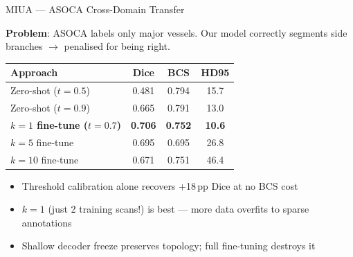 \documentclass[aspectratio=169,10pt]{beamer}
\newcommand{\good}[1]{\textcolor{green!60!black}{\textbf{#1}}}
\newcommand{\pp}{\,pp}
\begin{document}
\begin{frame}{MIUA --- ASOCA Cross-Domain Transfer}

\textbf{Problem}: ASOCA labels only major vessels. Our model correctly segments side branches $\rightarrow$ penalised for being right.

\vspace{0.2cm}
\centering
\begin{tabular}{l c c c}
\toprule
\textbf{Approach} & \textbf{Dice} & \textbf{BCS} & \textbf{HD95} \\
\midrule
Zero-shot ($t=0.5$) & 0.481 & 0.794 & 15.7 \\
Zero-shot ($t=0.9$) & 0.665 & 0.791 & 13.0 \\
\textbf{$k=1$ fine-tune ($t=0.7$)} & \good{0.706} & \good{0.752} & \good{10.6} \\
$k=5$ fine-tune & 0.695 & 0.695 & 26.8 \\
$k=10$ fine-tune & 0.671 & 0.751 & 46.4 \\
\bottomrule
\end{tabular}

\vspace{0.3cm}
\begin{itemize}
    \item Threshold calibration alone recovers +18\pp{} Dice at no BCS cost
    \item $k=1$ (just 2 training scans!) is best --- more data overfits to sparse annotations
    \item Shallow decoder freeze preserves topology; full fine-tuning destroys it
\end{itemize}

\end{frame}
\end{document}

